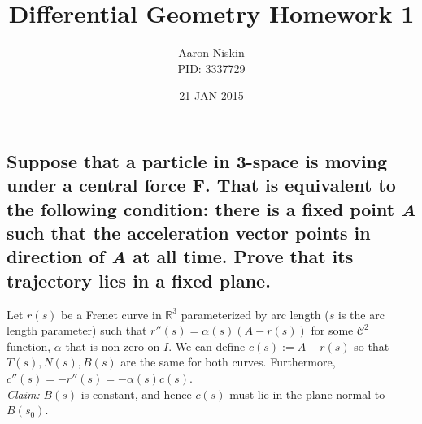 \documentclass[12pt]{amsart}
\begin{document}
\title{Differential Geometry Homework 1}
\author{Aaron Niskin \\PID: 3337729}
\date{21 JAN 2015}
\maketitle

\section{}
\subsection{Suppose that a particle in 3-space is moving under a central force \textbf{F}. That is equivalent to the following condition: there is a fixed point \emph{A} such that the acceleration vector points in direction of \emph{A} at all time. Prove that its trajectory lies in a fixed plane.}
Let $r(s)$ be a Frenet curve in $\mathbb{R}^3$ parameterized by arc length ($s$ is the arc length parameter) such that $r''(s)=\alpha(s)\left(A-r(s)\right)$ for some $\mathcal{C}^2$ function, $\alpha$ that is non-zero on $I$. We can define $c(s):=A-r(s)$ so that $T(s),N(s),B(s)$ are the same for both curves. Furthermore, $c''(s)=-r''(s)=-\alpha(s)c(s)$.
\\\textit{Claim:} $B(s)$ is constant, and hence $c(s)$ must lie in the plane normal to $B(s_0)$.
\end{document}
